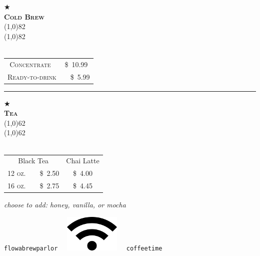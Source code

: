 \documentclass[letterpaper, 12pt]{article}%
\newcommand{\menuitem}[4]{
 \centering
  $\bigstar$\\
  \smallskip\vspace{0.1em}
  \textbf{\sffamily \textsc{\large#2}}\vspace{-1ex}\\
  \line(1,0){#1}\vspace{-2ex}\\
  \line(1,0){#1}\vspace{0.5ex}\\
  \smallskip
  \emph{\footnotesize#3}\\
  \vspace*{\fill}
  {\small#4}
}
\newcommand{\flowtherefore}{~~\raisebox{0.2ex}{$\therefore$}~~}
\newcommand{\price}[2]{
 \textsc{\small#1}\flowtherefore\$~\textsc{\small#2}
}
\newcommand{\varprice}[1]{
 \$~\textsc{\small#1}
}
\begin{document}
\newlength{\coffeerowtwo}
\setlength{\coffeerowtwo}{0.2\textwidth}
{\centering
   
    
 \begin{minipage}[t][\coffeerowtwo][b]{0.3\textwidth}
  \centering
  \menuitem{82}{
   Cold Brew}{\vspace{-1ex}
   }{
   \begin{tabular}{@{} c @{}}
   \price{Concentrate}{10.99}\\
   \price{Ready-to-drink}{5.99}\\
   \end{tabular}
   
   \rule{0pt}{2.2em}
    
  }
 \end{minipage} 
 \rule{3em}{0pt}
 \begin{minipage}[t][\coffeerowtwo][b]{0.3\textwidth}
  \centering
  \menuitem{62}{
   Tea}{
   }{
   \begin{tabular}{@{} c c @{}}
   Black Tea & Chai Latte\\
   \price{12 oz.}{2.50} & \varprice{4.00}\\
   \price{16 oz.}{2.75} & \varprice{4.45}\\
   \end{tabular}
   
   \rule{0pt}{1.2em}
    
  }
 \end{minipage} 
 
 \emph{choose to add: honey, vanilla, or mocha}
 
}



{\centering
 \texttt{\large flowabrewparlor}
 ~~\includegraphics{wifi}~~
 \texttt{\large coffeetime}
 
} 
\end{document}

